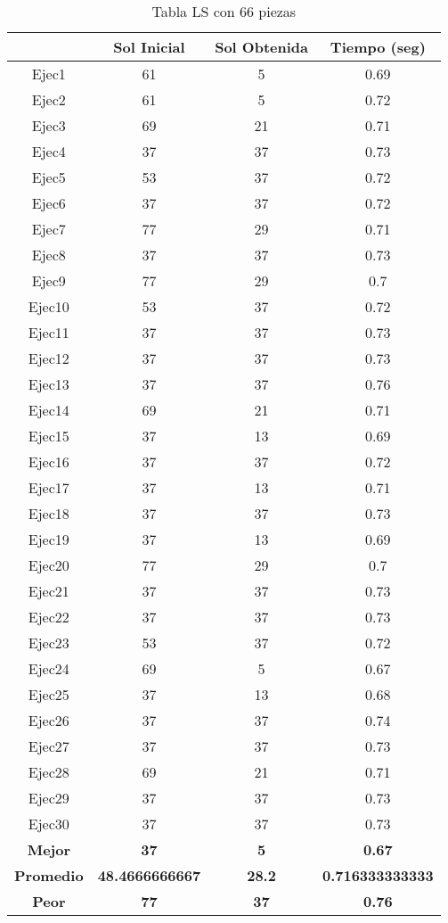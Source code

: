 
\begin{table}
\caption{Tabla LS con 66 piezas}
\centering
\begin{tabular}{|c|c|c|c|}
\hline
 & {\bf Sol Inicial} & {\bf Sol Obtenida} & {\bf Tiempo (seg)} \\
\hline
Ejec1 & 61 & 5  & 0.69 \\
\hline
Ejec2 & 61 & 5  & 0.72 \\
\hline
Ejec3 & 69 & 21  & 0.71 \\
\hline
Ejec4 & 37 & 37  & 0.73 \\
\hline
Ejec5 & 53 & 37  & 0.72 \\
\hline
Ejec6 & 37 & 37  & 0.72 \\
\hline
Ejec7 & 77 & 29  & 0.71 \\
\hline
Ejec8 & 37 & 37  & 0.73 \\
\hline
Ejec9 & 77 & 29  & 0.7 \\
\hline
Ejec10 & 53 & 37  & 0.72 \\
\hline
Ejec11 & 37 & 37  & 0.73 \\
\hline
Ejec12 & 37 & 37  & 0.73 \\
\hline
Ejec13 & 37 & 37  & 0.76 \\
\hline
Ejec14 & 69 & 21  & 0.71 \\
\hline
Ejec15 & 37 & 13  & 0.69 \\
\hline
Ejec16 & 37 & 37  & 0.72 \\
\hline
Ejec17 & 37 & 13  & 0.71 \\
\hline
Ejec18 & 37 & 37  & 0.73 \\
\hline
Ejec19 & 37 & 13  & 0.69 \\
\hline
Ejec20 & 77 & 29  & 0.7 \\
\hline
Ejec21 & 37 & 37  & 0.73 \\
\hline
Ejec22 & 37 & 37  & 0.73 \\
\hline
Ejec23 & 53 & 37  & 0.72 \\
\hline
Ejec24 & 69 & 5  & 0.67 \\
\hline
Ejec25 & 37 & 13  & 0.68 \\
\hline
Ejec26 & 37 & 37  & 0.74 \\
\hline
Ejec27 & 37 & 37  & 0.73 \\
\hline
Ejec28 & 69 & 21  & 0.71 \\
\hline
Ejec29 & 37 & 37  & 0.73 \\
\hline
Ejec30 & 37 & 37  & 0.73 \\
\hline
{\bf Mejor} & {\bf 37} & {\bf 5} & {\bf 0.67} \\
\hline
{\bf Promedio} & {\bf 48.4666666667} & {\bf 28.2} & {\bf 0.716333333333} \\
\hline
{\bf Peor} & {\bf 77} & {\bf 37} & {\bf 0.76} \\
\hline
\end{tabular}
\end{table}

